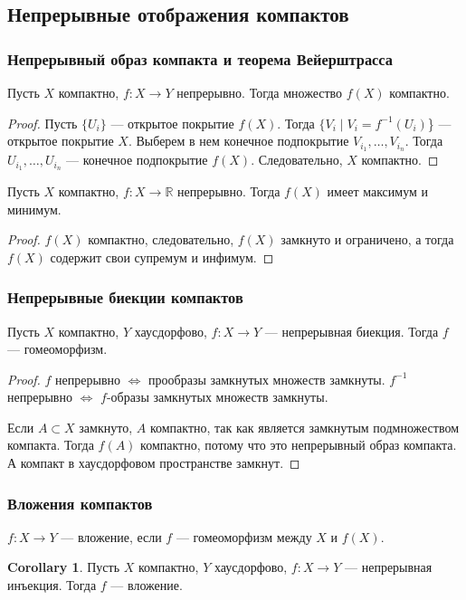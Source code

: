 \documentclass[11pt]{book}
\newcommand{\R}{\mathbb{R}}
\theoremstyle{definition}
\theoremstyle{plain}
\theoremstyle{plain}
\theoremstyle{definition}
\newtheorem*{cor}{Corollary}
\theoremstyle{remark}
\begin{document}
\subsection{Непрерывные отображения компактов}
\subsubsection{Непрерывный образ компакта и теорема Вейерштрасса}
\begin{thm}
    Пусть $ X$ компактно,  $ f: X \to  Y$ непрерывно.
    Тогда множество  $ f(X)$ компактно.
\end{thm}
\begin{proof}
    Пусть  $ \{U_i\}$ --- открытое покрытие $ f(X)$. Тогда  $ \{V_i \mid V_i = f^{-1}(U_i)$\} ---  открытое покрытие $ X$.
    Выберем в нем конечное подпокрытие  $ V_{i_1}, \ldots , V_{i_n}$. Тогда $ U_{i_1}, \ldots, U_{i_n}$ --- конечное подпокрытие $ f(X)$. Следовательно,  $ X$ компактно.
\end{proof}
\begin{thm}[Вейерштрасс]
    Пусть $ X$ компактно,  $ f: X \to  \R$ непрерывно. Тогда $ f(X)$ имеет максимум и минимум.
\end{thm}
\begin{proof}
    $ f(X)$ компактно, следовательно,  $ f(X)$ замкнуто и ограничено, а тогда  $ f(X)$ содержит свои супремум и инфимум.
\end{proof}
\subsubsection{Непрерывные биекции компактов}
\begin{thm}
    Пусть $ X$ компактно,  $ Y$  хаусдорфово, $ f: X \to  Y$ --- непрерывная биекция. Тогда $ f$ --- гомеоморфизм.
\end{thm}
\begin{proof}
    $ f$ непрерывно  $ \Longleftrightarrow $ прообразы замкнутых множеств замкнуты.
    $ f^{-1}$ непрерывно $ \Longleftrightarrow $ $ f$-образы замкнутых множеств замкнуты.

    Если  $ A \subset X$ замкнуто,
    $ A$ компактно, так как является  замкнутым подмножеством компакта.  Тогда $ f(A)$ компактно, потому что это непрерывный образ компакта. А компакт в хаусдорфовом пространстве замкнут.
\end{proof}
\subsubsection{Вложения компактов}
\begin{defn}
    $ f: X \to  Y$ --- {\sf вложение}, если $ f$ ---  гомеоморфизм между  $ X$ и  $ f(X)$.
\end{defn}
\begin{cor}
    Пусть $ X$ компактно,  $ Y$ хаусдорфово,  $ f: X \to  Y$ --- непрерывная  инъекция. Тогда $ f$ --- вложение.
\end{cor}
\clearpage
\end{document}
